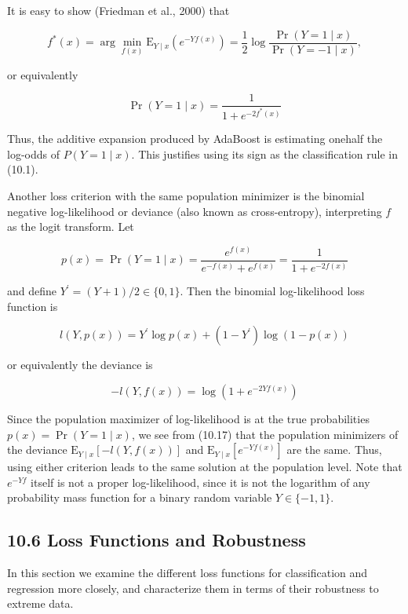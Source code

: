 \documentclass[10pt]{article}
\begin{document}
It is easy to show (Friedman et al., 2000) that


\begin{equation*}
f^{*}(x)=\arg \min _{f(x)} \mathrm{E}_{Y \mid x}\left(e^{-Y f(x)}\right)=\frac{1}{2} \log \frac{\operatorname{Pr}(Y=1 \mid x)}{\operatorname{Pr}(Y=-1 \mid x)}, \tag{10.16}
\end{equation*}


or equivalently

$$
\operatorname{Pr}(Y=1 \mid x)=\frac{1}{1+e^{-2 f^{*}(x)}}
$$

Thus, the additive expansion produced by AdaBoost is estimating onehalf the log-odds of $P(Y=1 \mid x)$. This justifies using its sign as the classification rule in (10.1).

Another loss criterion with the same population minimizer is the binomial negative log-likelihood or deviance (also known as cross-entropy), interpreting $f$ as the logit transform. Let


\begin{equation*}
p(x)=\operatorname{Pr}(Y=1 \mid x)=\frac{e^{f(x)}}{e^{-f(x)}+e^{f(x)}}=\frac{1}{1+e^{-2 f(x)}} \tag{10.17}
\end{equation*}


and define $Y^{\prime}=(Y+1) / 2 \in\{0,1\}$. Then the binomial log-likelihood loss function is

$$
l(Y, p(x))=Y^{\prime} \log p(x)+\left(1-Y^{\prime}\right) \log (1-p(x))
$$

or equivalently the deviance is


\begin{equation*}
-l(Y, f(x))=\log \left(1+e^{-2 Y f(x)}\right) \tag{10.18}
\end{equation*}


Since the population maximizer of log-likelihood is at the true probabilities $p(x)=\operatorname{Pr}(Y=1 \mid x)$, we see from (10.17) that the population minimizers of the deviance $\mathrm{E}_{Y \mid x}[-l(Y, f(x))]$ and $\mathrm{E}_{Y \mid x}\left[e^{-Y f(x)}\right]$ are the same. Thus, using either criterion leads to the same solution at the population level. Note that $e^{-Y f}$ itself is not a proper log-likelihood, since it is not the logarithm of any probability mass function for a binary random variable $Y \in\{-1,1\}$.

\subsection*{10.6 Loss Functions and Robustness}
In this section we examine the different loss functions for classification and regression more closely, and characterize them in terms of their robustness to extreme data.
\end{document}
